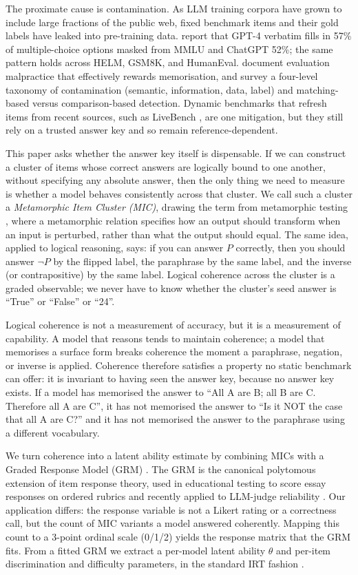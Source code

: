 \documentclass[11pt,letterpaper]{article}
\begin{document}
The proximate cause is contamination. As LLM training corpora have grown to include large fractions of the public web, fixed benchmark items and their gold labels have leaked into pre-training data. \citet{Deng2023} report that GPT-4 verbatim fills in 57\% of multiple-choice options masked from MMLU and ChatGPT 52\%; the same pattern holds across HELM, GSM8K, and HumanEval. \citet{Balloccu2024} document evaluation malpractice that effectively rewards memorisation, and \citet{Xu2024} survey a four-level taxonomy of contamination (semantic, information, data, label) and matching-based versus comparison-based detection. Dynamic benchmarks that refresh items from recent sources, such as LiveBench \citep{White2024}, are one mitigation, but they still rely on a trusted answer key and so remain reference-dependent.

This paper asks whether the answer key itself is dispensable. If we can construct a cluster of items whose correct answers are logically bound to one another, without specifying any absolute answer, then the only thing we need to measure is whether a model behaves consistently across that cluster. We call such a cluster a \emph{Metamorphic Item Cluster (MIC)}, drawing the term from metamorphic testing \citep{Chen2018, Cho2025}, where a metamorphic relation specifies how an output should transform when an input is perturbed, rather than what the output should equal. The same idea, applied to logical reasoning, says: if you can answer $P$ correctly, then you should answer $\neg P$ by the flipped label, the paraphrase by the same label, and the inverse (or contrapositive) by the same label. Logical coherence across the cluster is a graded observable; we never have to know whether the cluster's seed answer is ``True'' or ``False'' or ``24''.

Logical coherence is not a measurement of accuracy, but it is a measurement of capability. A model that reasons tends to maintain coherence; a model that memorises a surface form breaks coherence the moment a paraphrase, negation, or inverse is applied. Coherence therefore satisfies a property no static benchmark can offer: it is invariant to having seen the answer key, because no answer key exists. If a model has memorised the answer to ``All A are B; all B are C. Therefore all A are C'', it has not memorised the answer to ``Is it NOT the case that all A are C?'' and it has not memorised the answer to the paraphrase using a different vocabulary.

We turn coherence into a latent ability estimate by combining MICs with a Graded Response Model (GRM) \citep{Samejima1968}. The GRM is the canonical polytomous extension of item response theory, used in educational testing to score essay responses on ordered rubrics and recently applied to LLM-judge reliability \citep{Choi2026}. Our application differs: the response variable is not a Likert rating or a correctness call, but the count of MIC variants a model answered coherently. Mapping this count to a 3-point ordinal scale (0/1/2) yields the response matrix that the GRM fits. From a fitted GRM we extract a per-model latent ability $\theta$ and per-item discrimination and difficulty parameters, in the standard IRT fashion \citep{Polo2024, Zhou2025, Li2025}.
\end{document}

